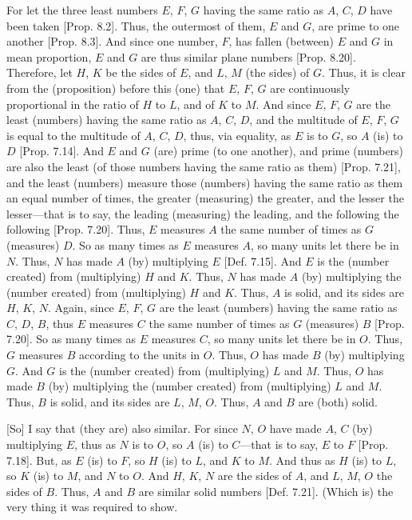 \begin{Parallel}{}{}
{For let the three least numbers $E$, $F$, $G$  having the
same ratio as $A$, $C$, $D$ have been taken [Prop. 8.2]. Thus,
the outermost of them, $E$ and $G$, are prime to one another
[Prop. 8.3]. And since one number, $F$, has
fallen (between) $E$ and $G$ in mean proportion, $E$ and $G$ are thus
similar plane numbers [Prop. 8.20].
Therefore, let $H$, $K$ be the sides of $E$, and $L$, $M$ (the sides) of $G$. Thus, it is clear from the (proposition) before this (one)
that $E$, $F$, $G$ are continuously proportional in the ratio of $H$ to $L$,
and of $K$ to $M$. And since $E$, $F$, $G$ are the least (numbers)
having the same ratio as $A$, $C$, $D$, and the multitude of $E$, $F$, $G$
is equal to the multitude of $A$, $C$, $D$, thus, via equality, as $E$ is to
$G$, so $A$ (is) to $D$ [Prop. 7.14]. And
$E$ and $G$ (are) prime (to one another), and prime (numbers) are also the least (of
those numbers having the same ratio as them) [Prop. 7.21],
and the least (numbers) measure those (numbers) having the same ratio
as them an equal number of times, the greater (measuring) the greater, and
the lesser the lesser---that is to say, the leading (measuring) the leading, and
the following the following [Prop. 7.20]. Thus,
$E$ measures $A$ the same number of times as $G$ (measures) $D$. 
So as many times as $E$ measures $A$, so many units let there be in $N$.
Thus, $N$ has made $A$ (by) multiplying $E$ [Def. 7.15]. And $E$ is the (number created) from (multiplying) $H$ and $K$. Thus, $N$ has made $A$ (by) multiplying
the (number created) from (multiplying) $H$ and $K$. Thus, $A$ is  solid, and its sides are $H$, $K$, $N$. Again, since $E$, $F$, $G$
are the least (numbers) having the same ratio as $C$, $D$, $B$, thus $E$
measures $C$ the same number of times as $G$ (measures) $B$ [Prop. 7.20]. So as many times as $E$ measures $C$, so many units let there be in $O$. Thus, $G$ measures $B$ according to
the units in $O$. Thus, $O$ has made $B$ (by) multiplying $G$. And
$G$ is the (number created) from (multiplying) $L$ and $M$. Thus, $O$ has made $B$ (by) multiplying the (number created) from (multiplying)
$L$ and $M$. Thus, $B$ is  solid, and its sides are $L$, $M$, $O$.
Thus,  $A$ and $B$ are (both) solid.

\epsfysize=2in
\centerline{}

\mbox{[}So] I say that (they are) also similar. For since $N$, $O$ have made
$A$, $C$ (by) multiplying $E$, thus as $N$ is to $O$, so $A$ (is) to $C$---that is to say, $E$ to $F$ [Prop. 7.18]. But, as $E$
(is) to $F$, so $H$ (is) to $L$, and $K$ to $M$. And thus as $H$ (is) to $L$,
so $K$ (is) to $M$, and $N$ to $O$. And $H$, $K$, $N$
are the sides of $A$, and $L$, $M$, $O$ the sides of $B$. Thus,
$A$ and $B$ are similar solid numbers [Def. 7.21]. 
(Which is) the very thing it was required to show.}
\end{Parallel}


